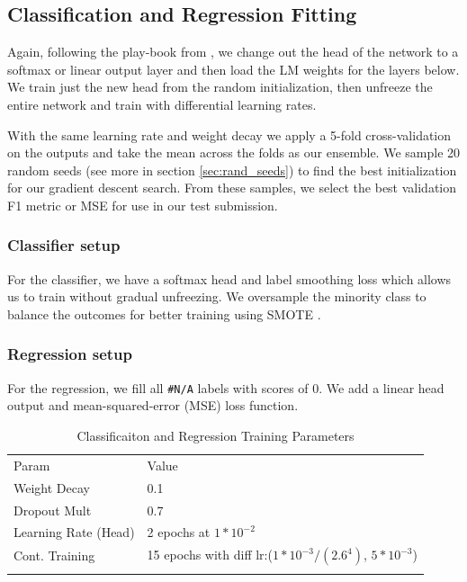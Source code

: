 \documentclass[smallextended]{svjour3}       %
\begin{document}
\subsection{Classification and Regression Fitting}
Again, following the play-book from \cite{HowardRuder:DBLP:journals/corr/abs-1801-06146}, we change out the head of the network to a softmax or linear output layer and then load the LM weights for the layers below.  We train just the new head from the random initialization, then unfreeze the entire network and train with differential learning rates.

With the same learning rate and weight decay we apply a 5-fold cross-validation on the outputs and take the mean across the folds as our ensemble.  We sample 20 random seeds (see more in section \ref{sec:rand_seeds}) to find the best initialization for our gradient descent search.  From these samples, we select the best validation F1 metric or MSE for use in our test submission.
\subsubsection{Classifier setup}  For the classifier, we have a softmax head and label smoothing loss which allows us to train without gradual unfreezing.  We oversample the minority class to balance the outcomes for better training using SMOTE \cite{Chawla:2002:SSM:1622407.1622416}.  
\subsubsection{Regression setup}  For the regression, we fill all \verb|#N/A| labels with scores of 0.  We add a linear head output and mean-squared-error (MSE) loss function. 

\begin{table}[ht]
	\caption{Classificaiton and Regression Training Parameters}
	\label{tab:clas_training}       %
	\begin{tabular}{ll}
		\hline\noalign{\smallskip}
		Param & Value \\
		\noalign{\smallskip}\hline\noalign{\smallskip}
		Weight Decay & 0.1  \\
		Dropout Mult &  0.7 \\
		Learning Rate (Head)& 2 epochs at $1*10^{-2}$\\
		Cont. Training & 15 epochs with diff lr:($1*10^{-3}/(2.6^4)$, $5*10^{-3}$)\\
		\noalign{\smallskip}\hline
	\end{tabular}
\end{table}
\end{document}
